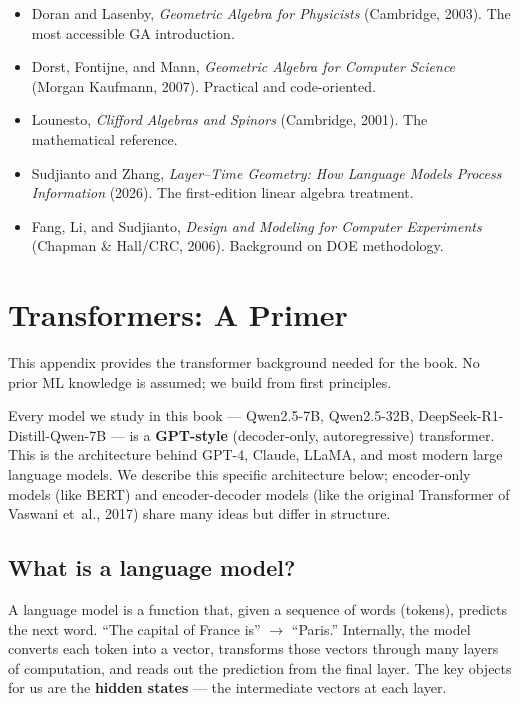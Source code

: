 \documentclass[11pt, twoside, openright]{memoir}
\numberwithin{equation}{chapter}
\begin{document}
\begin{itemize}[nosep]
\item Doran and Lasenby, \emph{Geometric Algebra for Physicists}
  (Cambridge, 2003).  The most accessible GA introduction.
\item Dorst, Fontijne, and Mann, \emph{Geometric Algebra for Computer
  Science} (Morgan Kaufmann, 2007).  Practical and code-oriented.
\item Lounesto, \emph{Clifford Algebras and Spinors} (Cambridge, 2001).
  The mathematical reference.
\item Sudjianto and Zhang, \emph{Layer--Time Geometry: How Language
  Models Process Information} (2026).  The first-edition linear algebra
  treatment.
\item Fang, Li, and Sudjianto, \emph{Design and Modeling for Computer
  Experiments} (Chapman \& Hall/CRC, 2006).  Background on DOE
  methodology.
\end{itemize}


\appendix


\chapter{Transformers: A Primer}
\label{app:transformers}

This appendix provides the transformer background needed for the book.
No prior ML knowledge is assumed; we build from first principles.

Every model we study in this book --- Qwen2.5-7B, Qwen2.5-32B,
DeepSeek-R1-Distill-Qwen-7B --- is a \textbf{GPT-style}
(decoder-only, autoregressive) transformer.  This is the architecture
behind GPT-4, Claude, LLaMA, and most modern large language models.
We describe this specific architecture below; encoder-only models
(like BERT) and encoder-decoder models (like the original Transformer
of Vaswani et~al., 2017) share many ideas but differ in structure.

\section{What is a language model?}

A language model is a function that, given a sequence of words (tokens),
predicts the next word.  ``The capital of France is'' $\to$ ``Paris.''
Internally, the model converts each token into a vector, transforms
those vectors through many layers of computation, and reads out the
prediction from the final layer.  The key objects for us are the
\textbf{hidden states} --- the intermediate vectors at each layer.
\end{document}
